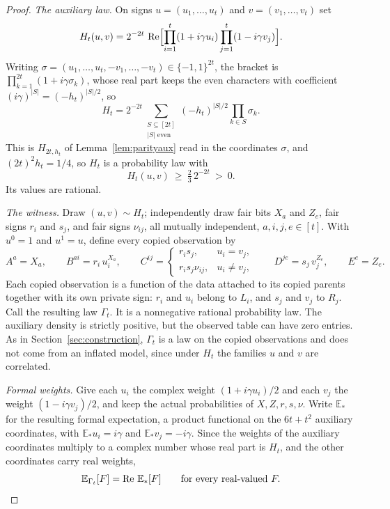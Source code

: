 \documentclass[11pt]{article}
\theoremstyle{plain}
\theoremstyle{definition}
\newcommand{\E}{\mathbb E}
\begin{document}
\begin{proof}
\emph{The auxiliary law.} On signs $u=(u_1,\dots,u_t)$ and $v=(v_1,\dots,v_t)$ set
\begin{equation}\label{eq:Ht}
H_t(u,v)=2^{-2t}\,\operatorname{Re}\Bigl[\prod_{i=1}^t(1+i\gamma u_i)\prod_{j=1}^t(1-i\gamma v_j)\Bigr].
\end{equation}
Writing $\sigma=(u_1,\dots,u_t,-v_1,\dots,-v_t)\in\{-1,1\}^{2t}$, the bracket is $\prod_{k=1}^{2t}(1+i\gamma\sigma_k)$, whose real part keeps the even characters with coefficient $(i\gamma)^{|S|}=(-h_t)^{|S|/2}$, so
\[
H_t=2^{-2t}\sum_{\substack{S\subseteq[2t]\\|S|\text{ even}}}(-h_t)^{|S|/2}\prod_{k\in S}\sigma_k .
\]
This is $H_{2t,h_t}$ of Lemma~\ref{lem:parityaux} read in the coordinates $\sigma$, and $(2t)^2h_t=1/4$, so $H_t$ is a probability law with
\begin{equation}\label{eq:Htpos}
H_t(u,v)\ \ge\ \tfrac23\,2^{-2t}\ >\ 0 .
\end{equation}
Its values are rational.

\emph{The witness.} Draw $(u,v)\sim H_t$; independently draw fair bits $X_a$ and $Z_e$, fair signs $r_i$ and $s_j$, and fair signs $\nu_{ij}$, all mutually independent, $a,i,j,e\in[t]$. With $u^0=1$ and $u^1=u$, define every copied observation by
\begin{equation}\label{eq:pathwitness}
A^a=X_a,\qquad
B^{ai}=r_i\,u_i^{X_a},\qquad
C^{ij}=\begin{cases}r_is_j,&u_i=v_j,\\ r_is_j\nu_{ij},&u_i\ne v_j,\end{cases}\qquad
D^{je}=s_j\,v_j^{Z_e},\qquad
E^e=Z_e .
\end{equation}
Each copied observation is a function of the data attached to its copied parents together with its own private sign: $r_i$ and $u_i$ belong to $L_i$, and $s_j$ and $v_j$ to $R_j$. Call the resulting law $\Gamma_t$. It is a nonnegative rational probability law. The auxiliary density is strictly positive, but the observed table can have zero entries. As in Section~\ref{sec:construction}, $\Gamma_t$ is a law on the copied observations and does not come from an inflated model, since under $H_t$ the families $u$ and $v$ are correlated.

\emph{Formal weights.} Give each $u_i$ the complex weight $(1+i\gamma u_i)/2$ and each $v_j$ the weight $(1-i\gamma v_j)/2$, and keep the actual probabilities of $X,Z,r,s,\nu$. Write $\E_\ast$ for the resulting formal expectation, a product functional on the $6t+t^2$ auxiliary coordinates, with $\E_\ast u_i=i\gamma$ and $\E_\ast v_j=-i\gamma$. Since the weights of the auxiliary coordinates multiply to a complex number whose real part is $H_t$, and the other coordinates carry real weights,
\begin{equation}\label{eq:realpart}
\E_{\Gamma_t}[F]=\Real\,\E_\ast[F]\qquad\text{for every real-valued }F .
\end{equation}


\end{proof}
\end{document}
